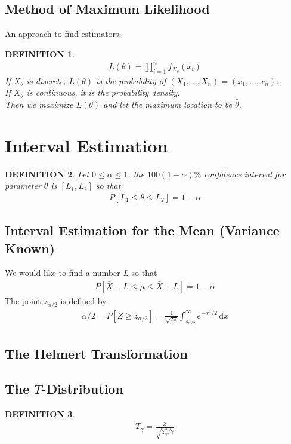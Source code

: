 \documentclass[11pt,a4paper]{article}
\newcommand{\dd}{\mathrm{d}}
\newcommand{\dx}{\dd x}
\newtheorem*{definition}{\bf DEFINITION}
\begin{document}
\subsection{Method of Maximum Likelihood}
An approach to find estimators.
\begin{definition}
    \begin{gather*}
        L(\theta)=\prod_{i=1}^n f_{X_\theta}(x_i)
    \end{gather*}
    If $X_\theta$ is discrete, $L(\theta)$ is the probability of $(X_1,\dots,X_n)=(x_1,\dots,x_n)$.\\
    If $X_\theta$ is continuous, it is the probability density.\\

    \noindent Then we maximize $L(\theta)$ and let the maximum location to be $\hat{\theta}$.
\end{definition}



\section{Interval Estimation}
\begin{definition}
    Let $0\le\alpha\le1$, the $100(1-\alpha)\%$ confidence interval for
    parameter $\theta$ is $[L_1, L_2]$ so that
    \begin{gather*}
        P[L_1\le\theta\le L_2]=1-\alpha
    \end{gather*}
\end{definition}

\subsection{Interval Estimation for the Mean (Variance Known)}
We would like to find a number $L$ so that
\begin{gather*}
    P[\bar{X}-L\le\mu\le\bar{X}+L]=1-\alpha
\end{gather*}
The point $z_{\alpha/2}$ is defined by
\begin{gather*}
    \alpha/2=P[Z\ge z_{\alpha/2}]=\frac{1}{\sqrt{2\pi}}\int_{z_{\alpha/2}}^{\infty}
    e^{-x^2/2}\,\dx
\end{gather*}

\subsection{The Helmert Transformation}

\subsection{The $T$-Distribution}
\begin{definition}
    \begin{gather}
        T_\gamma = \frac{Z}{\sqrt{\chi^2_\gamma/\gamma}}
    \end{gather}
\end{definition}
\end{document}
